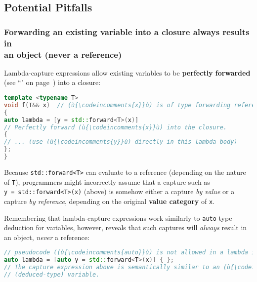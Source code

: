 \subsection[Potential Pitfalls]{Potential Pitfalls}\label{potential-pitfalls-lambdacapture}

\subsubsection[Forwarding an existing variable into a closure always results in an object (never a reference)]{Forwarding an existing variable into a closure always results in\\ an object (never a reference)}\label{forwarding-an-existing-variable-into-a-closure-always-results-in-an-object-(never-a-reference)}

Lambda-capture expressions allow existing variables to be
\textbf{perfectly forwarded} (see ``" on page~\pageref{forwardingref})
into a closure:

\begin{lstlisting}[language=C++]
template <typename T>
void f(T&& x)  // (ù{\codeincomments{x}}ù) is of type forwarding reference to (ù{\codeincomments{T}}ù).
{
auto lambda = [y = std::forward<T>(x)]
// Perfectly forward (ù{\codeincomments{x}}ù) into the closure.
{
// ... (use (ù{\codeincomments{y}}ù) directly in this lambda body)
};
}
\end{lstlisting}

\noindent Because \texttt{std::forward<T>} can evaluate to a reference (depending
on the nature of \texttt{T}), programmers might incorrectly assume that
a capture such as \texttt{y}~\texttt{=}~\texttt{std::forward<T>(x)}
(above) is somehow either a capture \emph{by value} or a capture
\emph{by reference}, depending on the original \textbf{value category}
of \texttt{x}.

Remembering that lambda-capture expressions work similarly to
\texttt{auto} type deduction for variables, however,
reveals that such captures will \emph{always} result in an object, \emph{never} a reference:

\begin{lstlisting}[language=C++]
// pseudocode ((ù{\codeincomments{auto}}ù) is not allowed in a lambda introducer.)
auto lambda = [auto y = std::forward<T>(x)] { };
// The capture expression above is semantically similar to an (ù{\codeincomments{auto}}ù)
// (deduced-type) variable.
\end{lstlisting}

